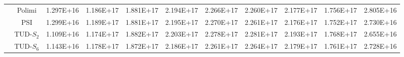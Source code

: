 \documentclass[letterpaper,11pt]{article}
\begin{document}
\begin{table}[htbp!]
\begin{tabular}{c c c c c c c c c c c}
		& Polimi & 1.297E+16 & 1.186E+17 & 1.881E+17 & 2.194E+17 & 2.266E+17 & 2.260E+17 & 2.177E+17 & 1.756E+17 & 2.805E+16 \\
		& PSI & 1.299E+16 & 1.189E+17 & 1.881E+17 & 2.195E+17 & 2.270E+17 & 2.261E+17 & 2.176E+17 & 1.752E+17 & 2.730E+16 \\
		& TUD-$S_2$ & 1.109E+16 & 1.174E+17 & 1.882E+17 & 2.203E+17 & 2.278E+17 & 2.281E+17 & 2.193E+17 & 1.768E+17 & 2.655E+16 \\
		& TUD-$S_6$ & 1.143E+16 & 1.178E+17 & 1.872E+17 & 2.186E+17 & 2.261E+17 & 2.264E+17 & 2.179E+17 & 1.761E+17 & 2.728E+16 \\
		\bottomrule
	\end{tabular}
\end{table}
\end{document}
